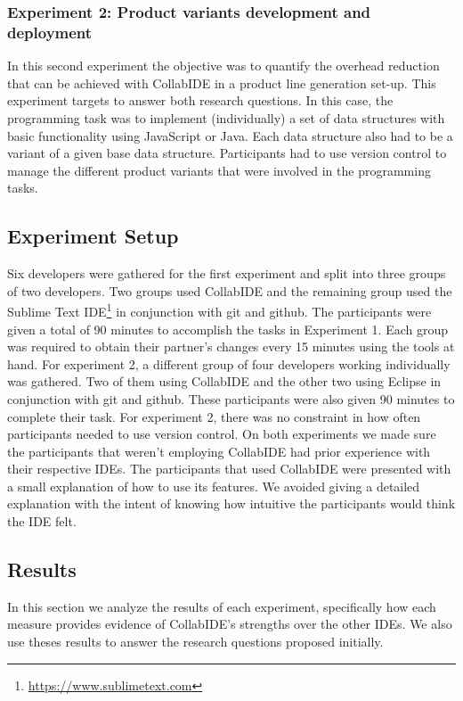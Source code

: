 \subsubsection{Experiment 2: Product variants development and deployment}
In this second experiment the objective was to quantify the overhead reduction that can be achieved 
with CollabIDE in a product line generation set-up. This experiment targets to answer both research 
questions. In this case, the programming task was to implement (individually) a set of 
data structures with basic functionality using JavaScript or Java. Each data structure also had to be a 
variant of a given base data structure. Participants had to use version control to manage the different 
product variants that were involved in the programming tasks.

\subsection{Experiment Setup}

Six developers were gathered for the first experiment and split into three groups of two developers. 
Two groups used CollabIDE and the remaining group used the Sublime Text 
IDE\footnote{\url{https://www.sublimetext.com}} in conjunction with git and github. The participants 
were given a total of 90 minutes to accomplish the tasks in Experiment 1. Each group was required to 
obtain their partner’s changes every 15 minutes using the tools at hand. For experiment 2, a different 
group of four developers working individually was gathered. Two of them using CollabIDE and the 
other two using Eclipse in conjunction with git and github. These participants were also given 90 
minutes to complete their task. For experiment 2, there was no constraint in how often participants 
needed to use version control. On both experiments we made sure the participants that weren't employing
CollabIDE had prior experience with their respective IDEs. The participants that used CollabIDE were presented
with a small explanation of how to use its features. We avoided giving a detailed explanation with the intent of
knowing how intuitive the participants would think the IDE felt.
	
\subsection{Results}

In this section we analyze the results of each experiment, specifically how each measure provides 
evidence of CollabIDE's strengths over the other IDEs. We also use theses results to answer the 
research questions proposed initially.

